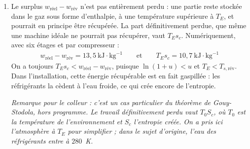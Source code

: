 \begin{correction}
\begin{enumerate}
\begin{enumerate}
		\item Le surplus $w_{\text{réel}}-w_{\text{rév}}$ n'est pas entièrement perdu : une partie reste stockée dans le gaz sous forme d'enthalpie, à une température supérieure à $T_E$, et pourrait en principe être récupérée. La part définitivement perdue, que même une machine idéale ne pourrait pas récupérer, vaut $T_Es_c$. Numériquement, avec six étages et par compresseur :
		\begin{align*}
			w_{\text{réel}}-w_{\text{rév}}=13{,}5~\text{kJ}\cdot\text{kg}^{-1} \qquad\text{et}\qquad T_Es_c=10{,}7~\text{kJ}\cdot\text{kg}^{-1}
		\end{align*}
		On a toujours $T_Es_c<w_{\text{réel}}-w_{\text{rév}}$, puisque $\ln(1+u)<u$ et $T_E<T_{s,\text{rév}}$. Dans l'installation, cette énergie récupérable est en fait gaspillée : les réfrigérants la cèdent à l'eau froide, ce qui crée encore de l'entropie.

		\textit{Remarque pour le colleur : c'est un cas particulier du théorème de Gouy-Stodola, hors programme. Le travail définitivement perdu vaut $T_0S_c$, où $T_0$ est la température de l'environnement et $S_c$ l'entropie créée. On a pris ici l'atmosphère à $T_E$ pour simplifier ; dans le sujet d'origine, l'eau des réfrigérants entre à $280$~K.}
	\end{enumerate}

\end{enumerate}

\end{correction}
